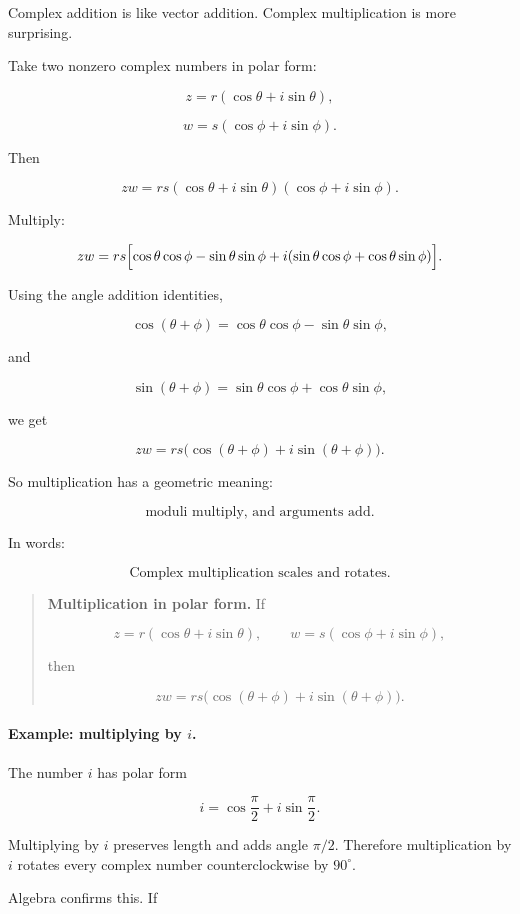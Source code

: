 Complex addition is like vector addition.  Complex multiplication is more surprising.

Take two nonzero complex numbers in polar form:

\[
z=r(\cos\theta+i\sin\theta),
\]

\[
w=s(\cos\phi+i\sin\phi).
\]

Then

\[
zw
=
rs(\cos\theta+i\sin\theta)(\cos\phi+i\sin\phi).
\]

Multiply:

\[
zw
=
rs\Bigl[
\cos\theta\cos\phi
-\sin\theta\sin\phi
+i(\sin\theta\cos\phi+\cos\theta\sin\phi)
\Bigr].
\]

Using the angle addition identities,

\[
\cos(\theta+\phi)=\cos\theta\cos\phi-\sin\theta\sin\phi,
\]

and

\[
\sin(\theta+\phi)=\sin\theta\cos\phi+\cos\theta\sin\phi,
\]

we get

\[
\boxed{
zw
=
rs\bigl(\cos(\theta+\phi)+i\sin(\theta+\phi)\bigr).
}
\]

So multiplication has a geometric meaning:

\[
\boxed{
\text{moduli multiply, and arguments add.}
}
\]

In words:

\[
\boxed{
\text{Complex multiplication scales and rotates.}
}
\]

\begin{quote}
\textbf{Multiplication in polar form.}
If

\[
z=r(\cos\theta+i\sin\theta),
\qquad
w=s(\cos\phi+i\sin\phi),
\]

then

\[
\boxed{
zw=rs\bigl(\cos(\theta+\phi)+i\sin(\theta+\phi)\bigr).
}
\]
\end{quote}

\paragraph{Example: multiplying by \(i\).}
The number \(i\) has polar form

\[
i=\cos\frac{\pi}{2}+i\sin\frac{\pi}{2}.
\]

Multiplying by \(i\) preserves length and adds angle \(\pi/2\).  Therefore multiplication
by \(i\) rotates every complex number counterclockwise by \(90^\circ\).

Algebra confirms this.  If

